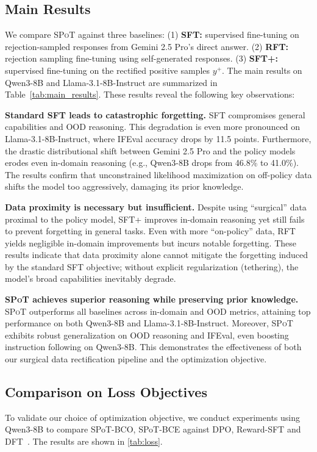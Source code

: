 \documentclass{article}
\newcommand{\methodName}{{\textsc{SPoT}}\xspace}
\theoremstyle{plain}
\theoremstyle{definition}
\theoremstyle{remark}
\begin{document}


\subsection{Main Results}
We compare \methodName against three baselines: (1) \textbf{SFT:} supervised fine-tuning on rejection-sampled responses from Gemini 2.5 Pro's direct answer. (2) \textbf{RFT:} rejection sampling fine-tuning using self-generated responses. (3) \textbf{SFT+:} supervised fine-tuning on the rectified positive samples $y^+$. The main results on Qwen3-8B and Llama-3.1-8B-Instruct are summarized in Table~\ref{tab:main_results}. These results reveal the following
key observations:

\textbf{Standard SFT leads to catastrophic forgetting.}
SFT compromises general capabilities and OOD reasoning. This degradation is even more pronounced on Llama-3.1-8B-Instruct, where IFEval accuracy drops by 11.5 points. Furthermore, the drastic distributional shift between Gemini 2.5 Pro and the policy models erodes even in-domain reasoning (e.g., Qwen3-8B drops from 46.8\% to 41.0\%). The results confirm that unconstrained likelihood maximization on off-policy data shifts the model too aggressively, damaging its prior knowledge.

\textbf{Data proximity is necessary but insufficient.}
 Despite using ``surgical'' data proximal to the policy model, SFT+ improves in-domain reasoning yet still fails to prevent forgetting in general tasks. Even with more ``on-policy'' data, RFT yields negligible in-domain improvements but incurs notable forgetting. These results indicate that data proximity alone cannot mitigate the forgetting induced by the standard SFT objective; without explicit regularization (tethering), the model's broad capabilities inevitably degrade.

\textbf{\methodName achieves superior reasoning while preserving prior knowledge.}
\methodName outperforms all baselines across in-domain and OOD metrics, attaining top performance on both Qwen3-8B and Llama-3.1-8B-Instruct. Moreover, \methodName exhibits robust generalization on OOD reasoning and IFEval, even boosting instruction following on Qwen3-8B. This demonstrates the effectiveness of both our surgical data rectification pipeline and the optimization objective.

\subsection{Comparison on Loss Objectives}
\label{sec:exper_loss}
To validate our choice of optimization objective, we conduct experiments using Qwen3-8B to compare SPoT-BCO, SPoT-BCE against DPO, Reward-SFT   and DFT~\cite{wu2025generalization}. The results are shown in \cref{tab:loss}.
\end{document}
